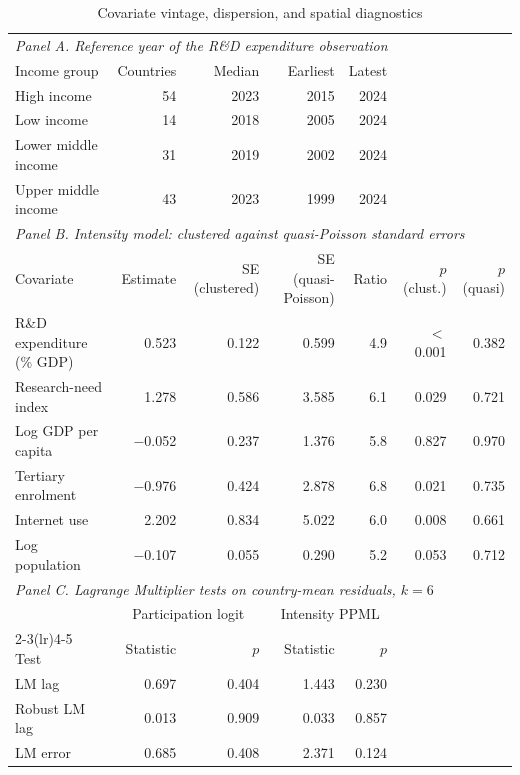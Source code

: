 \documentclass[ASNA,twocolumn]{USG}
\begin{document}
\begin{table}[t]
\centering
\scriptsize
\setlength{\tabcolsep}{3.5pt}
\caption{Covariate vintage, dispersion, and spatial diagnostics}
\label{tab:diagnostics}
\begin{tabular*}{\textwidth}{@{\extracolsep\fill}l r r r r r r@{}}
\toprule
\multicolumn{7}{l}{\textit{Panel A. Reference year of the R\&D expenditure observation}} \\
Income group & Countries & Median & Earliest & Latest & \multicolumn{2}{c}{} \\
\midrule
High income & 54 & 2023 & 2015 & 2024 & \multicolumn{2}{c}{} \\
Low income & 14 & 2018 & 2005 & 2024 & \multicolumn{2}{c}{} \\
Lower middle income & 31 & 2019 & 2002 & 2024 & \multicolumn{2}{c}{} \\
Upper middle income & 43 & 2023 & 1999 & 2024 & \multicolumn{2}{c}{} \\
\midrule
\multicolumn{7}{l}{\textit{Panel B. Intensity model: clustered against quasi-Poisson standard errors}} \\
Covariate & Estimate & SE (clustered) & SE (quasi-Poisson) & Ratio & $p$ (clust.) & $p$ (quasi) \\
\midrule
R\&D expenditure (\% GDP) & 0.523 & 0.122 & 0.599 & 4.9 & $<$0.001 & 0.382 \\
Research-need index & 1.278 & 0.586 & 3.585 & 6.1 & 0.029 & 0.721 \\
Log GDP per capita & $-$0.052 & 0.237 & 1.376 & 5.8 & 0.827 & 0.970 \\
Tertiary enrolment & $-$0.976 & 0.424 & 2.878 & 6.8 & 0.021 & 0.735 \\
Internet use & 2.202 & 0.834 & 5.022 & 6.0 & 0.008 & 0.661 \\
Log population & $-$0.107 & 0.055 & 0.290 & 5.2 & 0.053 & 0.712 \\
\midrule
\multicolumn{7}{l}{\textit{Panel C. Lagrange Multiplier tests on country-mean residuals, $k=6$}} \\
& \multicolumn{2}{c}{Participation logit} & \multicolumn{2}{c}{Intensity PPML} & \multicolumn{2}{c}{} \\
\cmidrule(lr){2-3}\cmidrule(lr){4-5}
Test & Statistic & $p$ & Statistic & $p$ & \multicolumn{2}{c}{} \\
\midrule
LM lag & 0.697 & 0.404 & 1.443 & 0.230 & \\
Robust LM lag & 0.013 & 0.909 & 0.033 & 0.857 & \\
LM error & 0.685 & 0.408 & 2.371 & 0.124 & \\

\end{tabular*}
\end{table}
\end{document}
